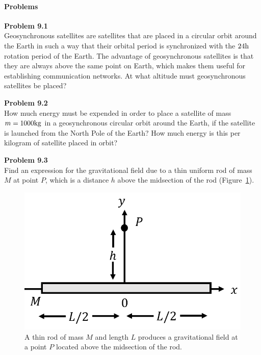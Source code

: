 \paragraph{Problems}

\begin{framed}
\textbf{Problem 9.1}\\
Geosynchronous satellites are satellites that are placed in a circular orbit around the Earth in such a way that their orbital period is synchronized with the $24 {\rm h}$ rotation period of the Earth. The advantage of geosynchronous satellites is that they are always above the same point on Earth, which makes them useful for establishing communication networks. At what altitude must geosynchronous satellites be placed?
\end{framed}

\begin{framed}
\textbf{Problem 9.2}\\
How much energy must be expended in order to place a satellite of mass $m=1000 {\rm kg}$ in a geosynchronous circular orbit around the Earth, if the satellite is launched from the North Pole of the Earth? How much energy is this per kilogram of satellite placed in orbit?
\end{framed}

\begin{framed}
\textbf{Problem 9.3}\\
Find an expression for the gravitational field due to a thin uniform rod of mass $M$ at point $P$, which is a distance $h$ above the midsection of the rod (Figure~\ref{fig:gravity:rodfield}).

\begin{figure}[!htbp]
\centering
\includegraphics[width=0.5\linewidth]{files/rodfield-ac4b93fd8281a0c6f73aee0611dff3e2.png}
\caption[]{A thin rod of mass $M$ and length $L$ produces a gravitational field at a point $P$ located above the midsection of the rod.}
\label{fig:gravity:rodfield}
\end{figure}
\end{framed}


